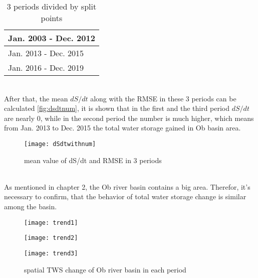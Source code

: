 \begin{table}[htbp] \centering
	\begin{tabular}{|l|}
		\hline
		Jan. 2003 - Dec. 2012   \\ \hline 
		Jan. 2013 - Dec. 2015	\\ \hline 
		Jan. 2016 - Dec. 2019	\\ \hline 
	\end{tabular}
	\caption{3 periods divided by split points}
	\label{tab:3periods}
\end{table}\\
After that, the mean $dS/dt$ along with the RMSE in these 3 periods can be calculated \autoref{fig:dsdtnum}, it is shown that in the first and the third period $dS/dt$ are nearly 0, while in the second period the number is much higher, which means from Jan. 2013 to Dec. 2015 the total water storage gained in Ob basin area.
\begin{figure}[htbp]
	\centering
	\texttt{[image: dSdtwithnum]} 
	\caption{mean value of dS/dt and RMSE in 3 periods} 
	\label{fig:dsdtnum}
\end{figure}\\
As mentioned in chapter 2, the Ob river basin contains a big area. Therefor, it's necessary to confirm, that the behavior of total water storage change is similar among the basin. 
\begin{figure}[htbp]\centering
	\begin{minipage}[t]{0.3\textwidth}
		\centering
		\texttt{[image: trend1]} %
	\end{minipage}
	\begin{minipage}[t]{0.3\textwidth}
		\centering
		\texttt{[image: trend2]} %
	\end{minipage}
	\begin{minipage}[t]{0.3\textwidth}
		\centering
		\texttt{[image: trend3]} %
	\end{minipage}
	\caption{spatial TWS change of Ob river basin in each period}
	\label{fig:twsspatial}
\end{figure}\\
\clearpage
